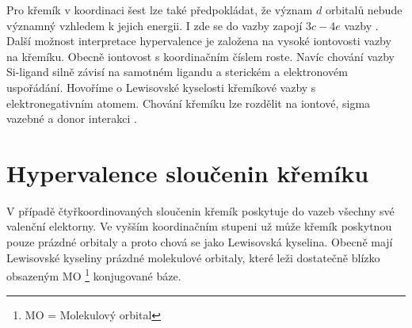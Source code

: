 \documentclass[
  digital, %
  table,   %
  lof,     %
  lot,     %
  oneside,
]{fithesis3}
\begin{document}
Pro křemík v koordinaci šest lze také předpokládat, že význam $d$ orbitalů nebude významný vzhledem k jejich energii. I zde se do vazby zapojí $3c-4e$ vazby \cite{Wagler2014}.\\
Další možnost interpretace hypervalence je založena na vysoké iontovosti vazby na křemíku. Obecně iontovost s koordinačním číslem roste.
Navíc chování vazby Si-ligand silně závisí na samotném ligandu a sterickém a elektronovém uspořádání. Hovoříme o Lewisovské kyselosti křemíkové vazby s elektronegativním atomem. Chování křemíku lze rozdělit na iontové, sigma vazebné a donor interakci \cite{Wagler2014}.\\


\section{Hypervalence sloučenin křemíku}\label{teorie_hypervalence}
V případě čtyřkoordinovaných sloučenin křemík poskytuje do vazeb všechny své valenční elektorny. Ve vyšším koordinačním stupeni už může křemík poskytnou pouze prázdné orbitaly a proto chová se jako Lewisovská kyselina. Obecně mají Lewisovské kyseliny prázdné molekulové orbitaly, které leži dostatečně blízko obsazeným MO \footnote{MO = Molekulový orbital} konjugované báze.
\end{document}
